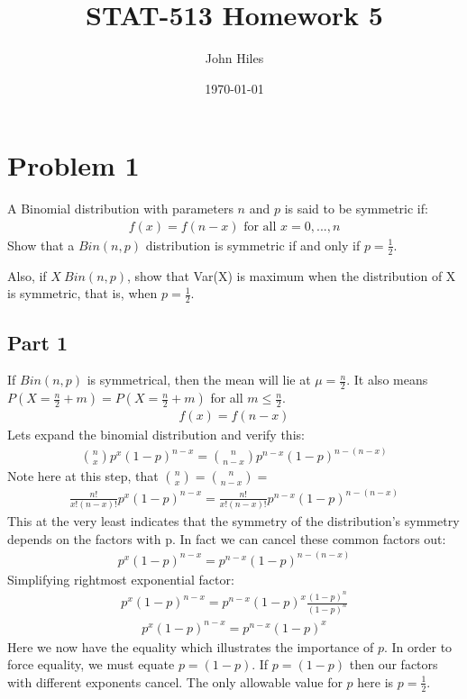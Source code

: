\documentclass{article}
\title{STAT-513 Homework 5}
\author{John Hiles}
\date\today
\begin{document}
\maketitle %


\section*{Problem 1}
A Binomial distribution with parameters $n$ and $p$ is said to be symmetric if:
\begin{align*}
f(x)=f(n-x) \text{ for all } x=0,...,n
\end{align*}
Show that a $Bin(n,p)$ distribution is symmetric if and only if $p=\frac{1}{2}$.

Also, if $X~Bin(n,p)$, show that Var(X) is maximum when the distribution of X is symmetric, that is, when $p=\frac{1}{2}$.
\subsection*{Part 1}
If $Bin(n,p)$ is symmetrical, then the mean will lie at $\mu = \frac{n}{2}$. It also means $P(X=\frac{n}{2}+m)=P(X=\frac{n}{2}+m)$ for all $m\leq \frac{n}{2}$.
\begin{align*}
f(x)=f(n-x)
\end{align*}
Lets expand the binomial distribution and verify this:
\begin{align*}
\binom{n}{x}p^x (1-p)^{n-x} = \binom{n}{n-x}p^{n-x} (1-p)^{n-(n-x)}
\end{align*}
Note here at this step, that $\binom{n}{x}=\binom{n}{n-x}=$
\begin{align*}
\frac{n!}{x!(n-x)!} p^x (1-p)^{n-x} = \frac{n!}{x!(n-x)!} p^{n-x} (1-p)^{n-(n-x)}
\end{align*}
This at the very least indicates that the symmetry of the distribution's symmetry depends on the factors with p. In fact we can cancel these common factors out:
\begin{align*}
p^x (1-p)^{n-x} = p^{n-x} (1-p)^{n-(n-x)}
\end{align*}
Simplifying rightmost exponential factor:
\begin{align*}
p^x (1-p)^{n-x} = p^{n-x} (1-p)^{x} \frac{(1-p)^{n}}{(1-p)^{n}}
\end{align*}
\begin{align*}
p^x (1-p)^{n-x} = p^{n-x} (1-p)^{x}
\end{align*}
Here we now have the equality which illustrates the importance of $p$. In order to force equality, we must equate $p=(1-p)$. If $p=(1-p)$ then our factors with different exponents cancel. The only allowable value for $p$ here is $p=\frac{1}{2}$.
\end{document}
